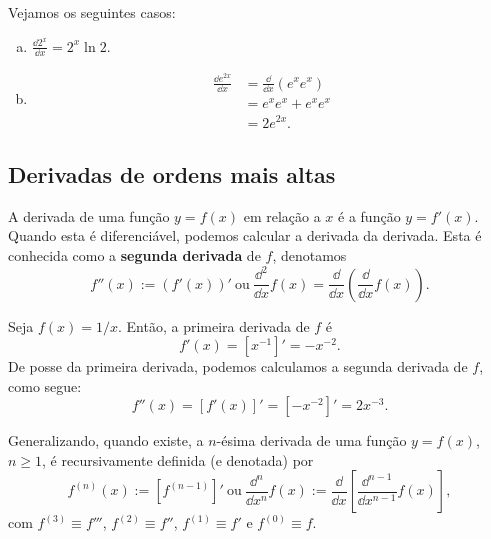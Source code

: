 \begin{ex}
Vejamos os seguintes casos:
\begin{enumerate}[a)]
\item $\displaystyle\frac{\dd 2^x}{\dd x} = 2^x\ln 2$.
\item
  \begin{align}
    \frac{\dd e^{2x}}{\dd x} &= \frac{\dd}{\dd x}(e^xe^x)\\
                             &= e^xe^x + e^xe^x\\
                             &= 2e^{2x}.
  \end{align}
\end{enumerate}  
\end{ex}

\subsection{Derivadas de ordens mais altas}

A derivada de uma função $y = f(x)$ em relação a $x$ é a função $y = f'(x)$. Quando esta é diferenciável, podemos calcular a derivada da derivada. Esta é conhecida como a {\bf segunda derivada} de $f$, denotamos
\begin{equation}
  f''(x) := (f'(x))' ~ \text{ou} ~ \frac{\dd^2}{\dd x}f(x) = \frac{\dd}{\dd x}\left(\frac{\dd}{\dd x}f(x)\right).
\end{equation}

\begin{ex}
  Seja $f(x) = 1/x$. Então, a primeira derivada de $f$ é
  \begin{equation}
    f'(x) = [x^{-1}]' = -x^{-2}.
  \end{equation}
  De posse da primeira derivada, podemos calculamos a segunda derivada de $f$, como segue:
  \begin{equation}
    f''(x) = [f'(x)]' = [-x^{-2}]' = 2x^{-3}.
  \end{equation}
\end{ex}

Generalizando, quando existe, a $n$-ésima derivada de uma função $y = f(x)$, $n\geq 1$, é recursivamente definida (e denotada) por
\begin{equation}
  f^{(n)}(x) := [f^{(n-1)}]' ~ \text{ou} ~ \frac{\dd^n}{\dd x^n}f(x) := \frac{\dd}{\dd x}\left[\frac{\dd^{n-1}}{\dd x^{n-1}}f(x)\right],
\end{equation}
com $f^{(3)}\equiv f'''$, $f^{(2)}\equiv f''$, $f^{(1)}\equiv f'$ e $f^{(0)}\equiv f$.

